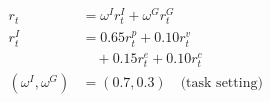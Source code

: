 \documentclass[border=8pt,12pt]{standalone}
\begin{document}
\color{ink}
$\displaystyle \begin{aligned}r_t&=\omega^I r_t^I+\omega^G r_t^G\\ r_t^I&=0.65r_t^p+0.10r_t^v\\ &\quad+0.15r_t^e+0.10r_t^c\\ (\omega^I,\omega^G)&=(0.7,0.3)\quad\text{(task setting)}\end{aligned}$
\end{document}
